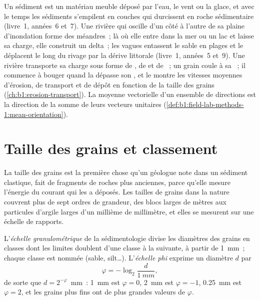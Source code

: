 \begin{recall}
Un sédiment est un matériau meuble déposé par l'eau, le vent ou la glace, et avec le temps les
sédiments s'empilent en couches qui durcissent en roche sédimentaire (livre~1, années~6
et~7). Une rivière qui oscille d'un côté à l'autre de sa plaine d'inondation forme des
méandres~; là où elle entre dans la mer ou un lac et laisse sa charge, elle construit un
delta~; les vagues entassent le sable en plages et le déplacent le long du rivage par la
dérive littorale (livre~1, années~5 et~9). Une rivière transporte sa charge sous forme de , de 
et de ~; un grain coule à sa ~; il commence à
bouger quand la  dépasse son , et le
 montre les vitesses moyennes d'érosion, de transport et de dépôt
en fonction de la taille des grains (\cref{ch:b1:erosion-transport}). La moyenne vectorielle d'un
ensemble de directions est la direction de la somme de leurs vecteurs unitaires
(\cref{def:b1:field-lab-methods-1:mean-orientation}).
\end{recall}

\section{Taille des grains et classement}\label{sec:b1:clastic-sediments:grain-size}

La taille des grains est la première chose qu'un géologue note dans un sédiment
clastique, fait de fragments de roches plus anciennes, parce qu'elle mesure l'énergie
du courant qui les a déposés. Les tailles de grains dans la nature couvrent plus de sept
ordres de grandeur, des blocs larges de mètres aux particules d'argile larges d'un millième
de millimètre, et elles se mesurent sur une échelle de rapports.

\begin{definition}\label{def:b1:clastic-sediments:grain-size}
L'\emph{échelle granulométrique} de la sédimentologie divise les
diamètres des grains en classes dont les limites doublent d'une classe à la
suivante, à partir de \qty{1}{mm}~; chaque classe est nommée (sable, silt\ldots).
L'\emph{échelle phi} exprime un diamètre $d$ par
\[
  \varphi = -\log_2 \frac{d}{\qty{1}{mm}},
\]
de sorte que $d = 2^{-\varphi}$~mm~: \qty{1}{mm} est $\varphi = 0$, \qty{2}{mm} est
$\varphi = -1$, \qty{0.25}{mm} est $\varphi = 2$, et les grains plus fins ont de plus grandes
valeurs de $\varphi$.
\end{definition}

